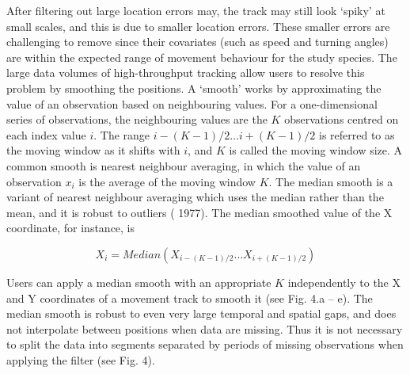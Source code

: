 \documentclass[10pt,paper=a4,headings=standardclasses
]{scrartcl}
\begin{document}
After filtering out large location errors may, the track may still look ‘spiky’ at small scales, and this is due to smaller location errors.
These smaller errors are challenging to remove since their covariates (such as speed and turning angles) are within the expected range of movement behaviour for the study species. 
The large data volumes of high-throughput tracking allow users to resolve this problem by smoothing the positions. 
A ‘smooth’ works by approximating the value of an observation based on neighbouring values.
For a one-dimensional series of observations, the neighbouring values are the $K$ observations centred on each index value $i$.
The range $ {i - (K-1)/2} \ldots {i + (K-1)/2} $ is referred to as the moving window as it shifts with $i$, and $K$ is called the moving window size.
A common smooth is nearest neighbour averaging, in which the value of an observation $x_i$ is the average of the moving window $K$.
The median smooth is a variant of nearest neighbour averaging which uses the median rather than the mean, and it is robust to outliers (\citeauthor{tukey1977} 1977).
The median smoothed value of the X coordinate, for instance, is
\begin{linenomath*}
    \begin{equation*}
        X_i = Median(X_{i - (K-1)/2} \ldots X_{i + (K-1)/2})
     \end{equation*}
\end{linenomath*}
Users can apply a median smooth with an appropriate $K$ independently to the X and Y coordinates of a movement track to smooth it (see Fig. 4.a -- e). 
The median smooth is robust to even very large temporal and spatial gaps, and does not interpolate between positions when data are missing. 
Thus it is not necessary to split the data into segments separated by periods of missing observations when applying the filter (see Fig. 4).
\end{document}
